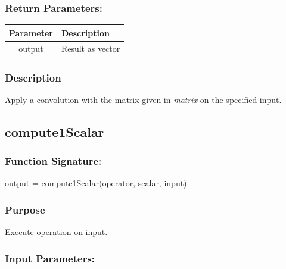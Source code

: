 \documentclass[a4]{scrreprt}
\begin{document}
\subsubsection{Return Parameters:}

\begin{longtabu} to \textwidth {|c|X|}
	\hline
	\textbf{Parameter} & \textbf{Description} \\ \hline
	\endhead
	output & Result as vector \\ \hline
\end{longtabu}

\subsubsection{Description}

Apply a convolution with the matrix given in \textit{matrix} on the specified input.

\subsection{compute1Scalar}

\subsubsection{Function Signature:}

\begin{center}
	output = compute1Scalar(operator, scalar, input)
\end{center}

\subsubsection{Purpose}

Execute operation on input.

\subsubsection{Input Parameters:}
\end{document}
